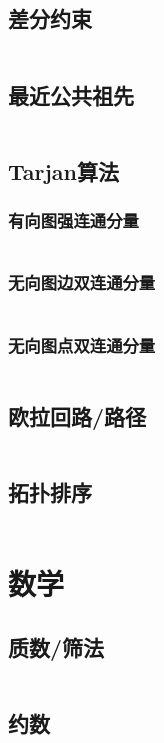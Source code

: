 \documentclass[a4paper,12pt]{article}
\begin{document}
\subsection{差分约束} %
\inputminted[breaklines, linenos]{c++}{graph/cfys/cfys.cc}
\subsection{最近公共祖先} %
\inputminted[breaklines, linenos]{c++}{graph/lca/lca.cc}
\subsection{Tarjan算法} %
\subsubsection{有向图强连通分量} 
\inputminted[breaklines, linenos]{c++}{graph/tarjan/scc.cc}
\subsubsection{无向图边双连通分量} 
\inputminted[breaklines, linenos]{c++}{graph/tarjan/edcc.cc}
\subsubsection{无向图点双连通分量} 
\inputminted[breaklines, linenos]{c++}{graph/tarjan/vdcc.cc}
\subsection{欧拉回路/路径} %
\inputminted[breaklines, linenos]{c++}{graph/eluer/eluer.cc}
\subsection{拓扑排序} %
\inputminted[breaklines, linenos]{c++}{graph/topsort/top.cc}

\newpage
\section{数学}
\subsection{质数/筛法}
\inputminted[breaklines, linenos]{c++}{math/prime.cc}
\subsection{约数}
\inputminted[breaklines, linenos]{c++}{math/yueshu.cc}
\end{document}
